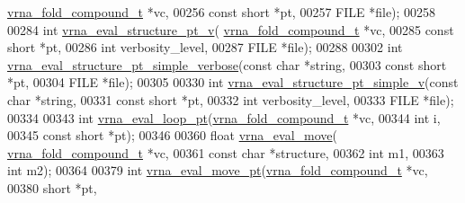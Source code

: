 \begin{DoxyCode}
      \hyperlink{group__fold__compound_structvrna__fc__s}{vrna\_fold\_compound\_t} *vc,
00256                                     \textcolor{keyword}{const} \textcolor{keywordtype}{short} *pt,
00257                                     FILE *file);
00258 
00284 \textcolor{keywordtype}{int} \hyperlink{group__eval_ga2c6533ba0afe4c88d335d8f1e0e2a48e}{vrna\_eval\_structure\_pt\_v}( \hyperlink{group__fold__compound_structvrna__fc__s}{vrna\_fold\_compound\_t} *vc,
00285                               \textcolor{keyword}{const} \textcolor{keywordtype}{short} *pt,
00286                               \textcolor{keywordtype}{int} verbosity\_level,
00287                               FILE *file);
00288 
00302 \textcolor{keywordtype}{int} \hyperlink{group__eval_ga76e152ee9a02be23da14cdddf52b4e44}{vrna\_eval\_structure\_pt\_simple\_verbose}(\textcolor{keyword}{const} \textcolor{keywordtype}{char} *\textcolor{keywordtype}{string},
00303                                           \textcolor{keyword}{const} \textcolor{keywordtype}{short} *pt,
00304                                           FILE *file);
00305 
00330 \textcolor{keywordtype}{int} \hyperlink{group__eval_gac40b813d35289da9816d0c1eec94faa5}{vrna\_eval\_structure\_pt\_simple\_v}(\textcolor{keyword}{const} \textcolor{keywordtype}{char} *\textcolor{keywordtype}{string},
00331                                     \textcolor{keyword}{const} \textcolor{keywordtype}{short} *pt,
00332                                     \textcolor{keywordtype}{int} verbosity\_level,
00333                                     FILE *file);
00334 
00343 \textcolor{keywordtype}{int} \hyperlink{group__eval_ga730ba4df55c02fd530a0cddd49faf760}{vrna\_eval\_loop\_pt}(\hyperlink{group__fold__compound_structvrna__fc__s}{vrna\_fold\_compound\_t} *vc,
00344                       \textcolor{keywordtype}{int} i,
00345                       \textcolor{keyword}{const} \textcolor{keywordtype}{short} *pt);
00346 
00360 \textcolor{keywordtype}{float} \hyperlink{group__eval_gaff1b9e4f4d17b434b0a822fe783672c1}{vrna\_eval\_move}( \hyperlink{group__fold__compound_structvrna__fc__s}{vrna\_fold\_compound\_t} *vc,
00361                       \textcolor{keyword}{const} \textcolor{keywordtype}{char} *structure,
00362                       \textcolor{keywordtype}{int} m1,
00363                       \textcolor{keywordtype}{int} m2);
00364 
00379 \textcolor{keywordtype}{int} \hyperlink{group__eval_ga123dabc119ea98c968a5e903cc46f0fb}{vrna\_eval\_move\_pt}(\hyperlink{group__fold__compound_structvrna__fc__s}{vrna\_fold\_compound\_t} *vc,
00380                       \textcolor{keywordtype}{short} *pt,

\end{DoxyCode}
